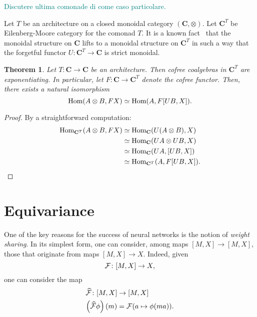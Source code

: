 \documentclass[12pt]{article}
\newtheorem{theorem}{Theorem}
\newcommand{\pietro}[1]{\textcolor{teal}{#1}}
\newcommand{\Hom}{{\textnormal{Hom}}}
\newcommand{\Cat}{{\mathbf{C}}}
\begin{document}
\pietro{Discutere ultima comonade di \cite{uustalu_comonadic_2008} come caso particolare.}

Let $T$ be an architecture on a closed monoidal category $(\Cat, \otimes)$. Let $\Cat^T$ be Eilenberg-Moore category for the comonad $T$. It is a known fact~\cite{Moerdijk_2002,pastro2009closed} that the monoidal structure on $\Cat$ lifts to a monoidal structure on $\Cat^T$ in such a way that the forgetful functor $U\colon \Cat^T \rightarrow \Cat$ is strict monoidal.

\begin{theorem}\label{thm:cofree_exponentiating}
    Let $T\colon \Cat \rightarrow \Cat$ be an architecture. Then cofree coalgebras in $\Cat^T$ are exponentiating. In particular, let $F\colon \Cat \rightarrow \Cat^T$ denote the cofree functor. Then, there exists a natural isomorphism
    \begin{equation*}
        \Hom(A\otimes B, FX) \simeq \Hom(A, F[UB, X]).
    \end{equation*}
\end{theorem}

\begin{proof}
    By a straightforward computation:
    \begin{align*}
        \Hom_{\Cat^T}(A\otimes B, FX)
        &\simeq \Hom_{\Cat}(U(A \otimes B), X)\\
        &\simeq \Hom_{\Cat}(UA \otimes UB, X)\\
        &\simeq \Hom_{\Cat}(UA, [UB, X])\\
        &\simeq \Hom_{\Cat^T}(A, F[UB, X]).
    \end{align*}
\end{proof}

\section{Equivariance}

One of the key reasons for the success of neural networks is the notion of {\em weight sharing}. In its simplest form, one can consider, among maps $[M, X] \rightarrow [M, X]$, those that originate from maps $[M, X] \rightarrow X$. Indeed, given
\begin{equation*}
    {\cal F} \colon [M, X] \rightarrow X,
\end{equation*}
one can consider the map
\begin{align*}
    \widehat{\cal F} \colon [M, X] &\rightarrow [M, X] \\
    \left(\widehat{\cal F}\phi\right)(m) &= {\cal F}(a \mapsto \phi(ma)).
\end{align*}
\end{document}
